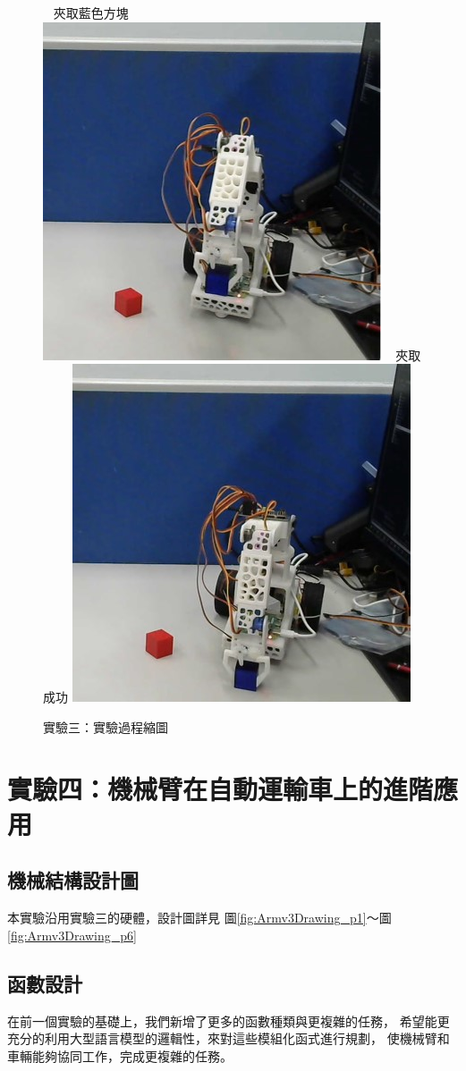 \documentclass[class=NCU_thesis, crop=false]{standalone}
\begin{document}
\begin{figure}[h]
    ~    
    \subcaptionbox
        {夾取藍色方塊
        \label{fig:fig-dataset-contrast-after-adjustment}}
        {\includegraphics[width=0.4\linewidth]{figures/Exp3 (6)_square.jpg}}
    ~
    \subcaptionbox
        {夾取成功
        \label{fig:fig-dataset-contrast-after-adjustment}}
        {\includegraphics[width=0.4\linewidth]{figures/Exp3 (7)_square.jpg}}   
\caption{實驗三：實驗過程縮圖}
\end{figure}

\section{實驗四：機械臂在自動運輸車上的進階應用}
\subsection{機械結構設計圖}
本實驗沿用實驗三的硬體，設計圖詳見 圖\ref{fig:Armv3Drawing_p1}～圖\ref{fig:Armv3Drawing_p6}

\subsection{函數設計}
在前一個實驗的基礎上，我們新增了更多的函數種類與更複雜的任務，
希望能更充分的利用大型語言模型的邏輯性，來對這些模組化函式進行規劃，
使機械臂和車輛能夠協同工作，完成更複雜的任務。
\end{document}
